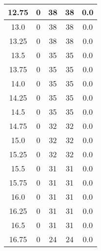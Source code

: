 \documentclass[letterpaper, 12pt]{article}
\begin{document}
\begin{longtable}{|c|c|c|c|c|}
\hline
12.75 & 0 & 38 & 38 & 0.0 \\
\hline
13.0 & 0 & 38 & 38 & 0.0 \\
\hline
13.25 & 0 & 38 & 38 & 0.0 \\
\hline
13.5 & 0 & 35 & 35 & 0.0 \\
\hline
13.75 & 0 & 35 & 35 & 0.0 \\
\hline
14.0 & 0 & 35 & 35 & 0.0 \\
\hline
14.25 & 0 & 35 & 35 & 0.0 \\
\hline
14.5 & 0 & 35 & 35 & 0.0 \\
\hline
14.75 & 0 & 32 & 32 & 0.0 \\
\hline
15.0 & 0 & 32 & 32 & 0.0 \\
\hline
15.25 & 0 & 32 & 32 & 0.0 \\
\hline
15.5 & 0 & 31 & 31 & 0.0 \\
\hline
15.75 & 0 & 31 & 31 & 0.0 \\
\hline
16.0 & 0 & 31 & 31 & 0.0 \\
\hline
16.25 & 0 & 31 & 31 & 0.0 \\
\hline
16.5 & 0 & 31 & 31 & 0.0 \\
\hline
16.75 & 0 & 24 & 24 & 0.0 \\
\hline
\end{longtable}
\end{document}
